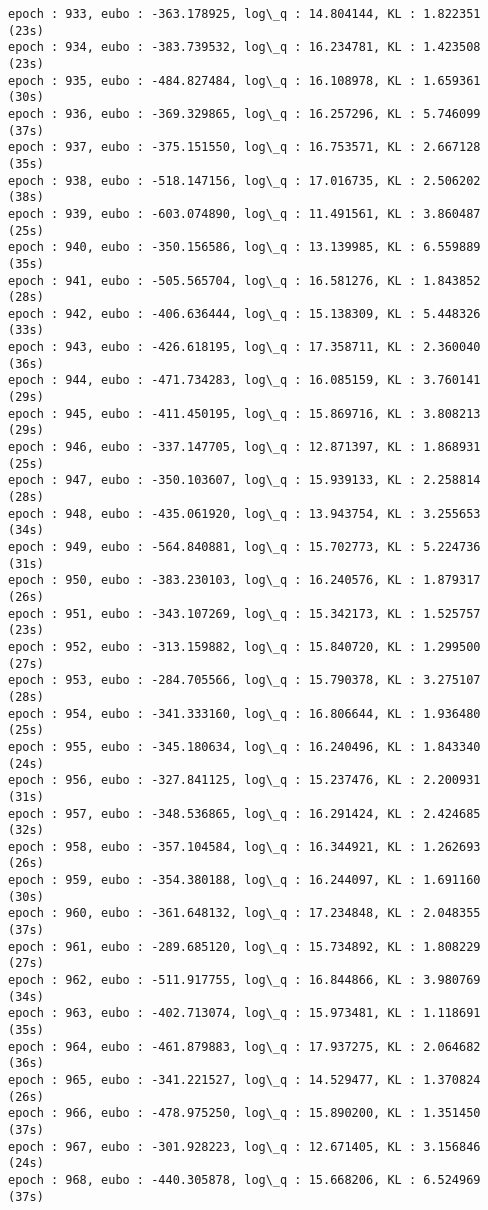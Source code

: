 \documentclass[11pt]{article}
\begin{document}
\begin{Verbatim}[commandchars=\\\{\}]
epoch : 933, eubo : -363.178925, log\_q : 14.804144, KL : 1.822351 (23s)
epoch : 934, eubo : -383.739532, log\_q : 16.234781, KL : 1.423508 (23s)
epoch : 935, eubo : -484.827484, log\_q : 16.108978, KL : 1.659361 (30s)
epoch : 936, eubo : -369.329865, log\_q : 16.257296, KL : 5.746099 (37s)
epoch : 937, eubo : -375.151550, log\_q : 16.753571, KL : 2.667128 (35s)
epoch : 938, eubo : -518.147156, log\_q : 17.016735, KL : 2.506202 (38s)
epoch : 939, eubo : -603.074890, log\_q : 11.491561, KL : 3.860487 (25s)
epoch : 940, eubo : -350.156586, log\_q : 13.139985, KL : 6.559889 (35s)
epoch : 941, eubo : -505.565704, log\_q : 16.581276, KL : 1.843852 (28s)
epoch : 942, eubo : -406.636444, log\_q : 15.138309, KL : 5.448326 (33s)
epoch : 943, eubo : -426.618195, log\_q : 17.358711, KL : 2.360040 (36s)
epoch : 944, eubo : -471.734283, log\_q : 16.085159, KL : 3.760141 (29s)
epoch : 945, eubo : -411.450195, log\_q : 15.869716, KL : 3.808213 (29s)
epoch : 946, eubo : -337.147705, log\_q : 12.871397, KL : 1.868931 (25s)
epoch : 947, eubo : -350.103607, log\_q : 15.939133, KL : 2.258814 (28s)
epoch : 948, eubo : -435.061920, log\_q : 13.943754, KL : 3.255653 (34s)
epoch : 949, eubo : -564.840881, log\_q : 15.702773, KL : 5.224736 (31s)
epoch : 950, eubo : -383.230103, log\_q : 16.240576, KL : 1.879317 (26s)
epoch : 951, eubo : -343.107269, log\_q : 15.342173, KL : 1.525757 (23s)
epoch : 952, eubo : -313.159882, log\_q : 15.840720, KL : 1.299500 (27s)
epoch : 953, eubo : -284.705566, log\_q : 15.790378, KL : 3.275107 (28s)
epoch : 954, eubo : -341.333160, log\_q : 16.806644, KL : 1.936480 (25s)
epoch : 955, eubo : -345.180634, log\_q : 16.240496, KL : 1.843340 (24s)
epoch : 956, eubo : -327.841125, log\_q : 15.237476, KL : 2.200931 (31s)
epoch : 957, eubo : -348.536865, log\_q : 16.291424, KL : 2.424685 (32s)
epoch : 958, eubo : -357.104584, log\_q : 16.344921, KL : 1.262693 (26s)
epoch : 959, eubo : -354.380188, log\_q : 16.244097, KL : 1.691160 (30s)
epoch : 960, eubo : -361.648132, log\_q : 17.234848, KL : 2.048355 (37s)
epoch : 961, eubo : -289.685120, log\_q : 15.734892, KL : 1.808229 (27s)
epoch : 962, eubo : -511.917755, log\_q : 16.844866, KL : 3.980769 (34s)
epoch : 963, eubo : -402.713074, log\_q : 15.973481, KL : 1.118691 (35s)
epoch : 964, eubo : -461.879883, log\_q : 17.937275, KL : 2.064682 (36s)
epoch : 965, eubo : -341.221527, log\_q : 14.529477, KL : 1.370824 (26s)
epoch : 966, eubo : -478.975250, log\_q : 15.890200, KL : 1.351450 (37s)
epoch : 967, eubo : -301.928223, log\_q : 12.671405, KL : 3.156846 (24s)
epoch : 968, eubo : -440.305878, log\_q : 15.668206, KL : 6.524969 (37s)

\end{Verbatim}
\end{document}
